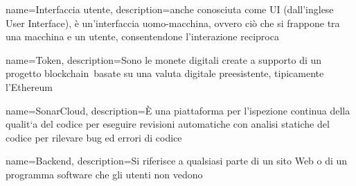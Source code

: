 {
	name={Interfaccia utente},
	description={anche conosciuta come UI (dall'inglese User Interface), è un'interfaccia uomo-macchina, ovvero ciò che si frappone tra una macchina e un utente, consentendone l'interazione reciproca}
}

{
	name={Token},
	description={Sono le monete digitali create a supporto di un progetto blockchain\glo\ basate su una valuta digitale preesistente, tipicamente l'Ethereum\glo}
}

{
	name={SonarCloud},
	description={È una piattaforma per l’ispezione continua della qualit`a del codice per eseguire revisioni automatiche con analisi statiche del codice per rilevare bug ed errori di codice}
}

{
	name={Backend},
	description={Si riferisce a qualsiasi parte di un sito Web o di un programma software che gli utenti non vedono}
}

